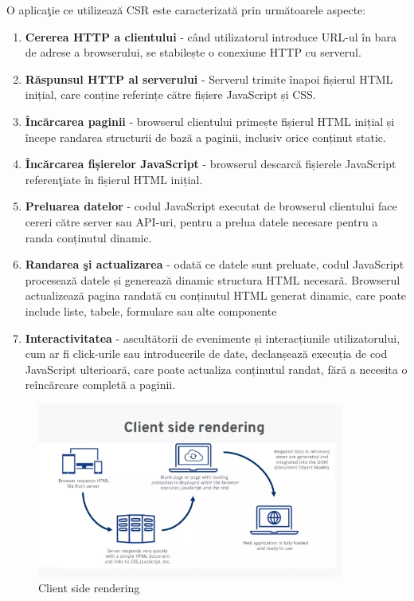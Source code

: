 \documentclass[12pt, a4paper]{report}
\begin{document}
O aplica\c tie ce utilizeaz\u a CSR este caracterizat\u a prin urm\u atoarele aspecte:
\begin{enumerate}
	\item \textbf{Cererea HTTP a clientului} - când utilizatorul introduce URL-ul în bara de adrese a browserului, se stabilește o conexiune HTTP cu serverul.
	\item \textbf{Răspunsul HTTP al serverului} - Serverul trimite înapoi fișierul HTML inițial, care conține referințe către fișiere JavaScript și CSS.
	\item \textbf{Încărcarea paginii} - browserul clientului primește fișierul HTML inițial și începe randarea structurii de bază a paginii, inclusiv orice conținut static.
	\item \textbf{Încărcarea fișierelor JavaScript} - browserul descarcă fișierele JavaScript referen\c tiate în fișierul HTML inițial.
	\item \textbf{Preluarea datelor} - codul JavaScript executat de browserul clientului face cereri către server sau API-uri, pentru a prelua datele necesare pentru a randa conținutul dinamic.
	\item \textbf{Randarea \c si actualizarea} - odată ce datele sunt preluate, codul JavaScript procesează datele și generează dinamic structura HTML necesară. Browserul actualizează pagina randat\u a cu conținutul HTML generat dinamic, care poate include liste, tabele, formulare sau alte componente
	\item \textbf{Interactivitatea} - ascultătorii de evenimente și interacțiunile utilizatorului, cum ar fi click-urile sau introducerile de date, declanșează execuția de cod JavaScript ulterioară, care poate actualiza conținutul randat, fără a necesita o reîncărcare completă a paginii.
\end{enumerate}
\newpage
\begin{figure}[htbp]
	\centering
	\includegraphics[width=0.9\textwidth]{csr-diagram.png}
	\caption{Client side rendering \protect\footnotemark}
	\label{fig:csr-diagram}
\end{figure}
\end{document}
